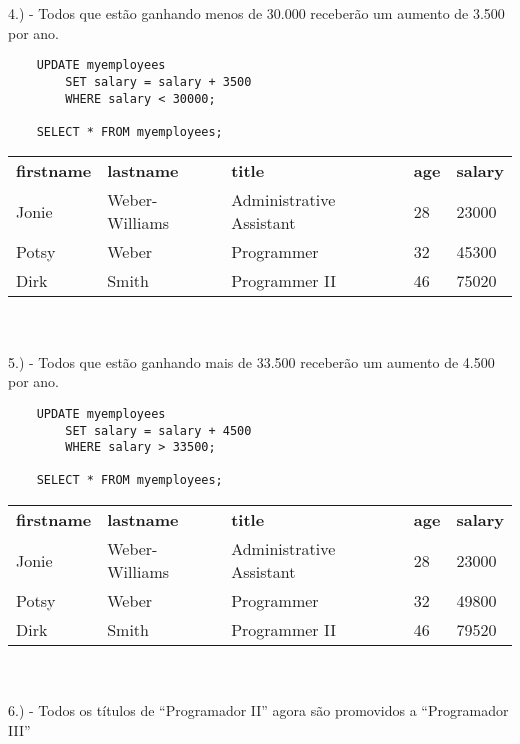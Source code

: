 4.) - Todos que estão ganhando menos de 30.000 receberão um aumento de 3.500 por ano.

\begin{lstlisting}
    UPDATE myemployees 
	    SET salary = salary + 3500 
	    WHERE salary < 30000;

    SELECT * FROM myemployees;
\end{lstlisting}

\begin{tabular}{l l l l l}
    {\textbf{firstname}} & {\textbf{lastname}} & {\textbf{title}} & {\textbf{age}} & {\textbf{salary}} \\
    {Jonie}              & {Weber-Williams}    & {Administrative Assistant}      & {28}           & {23000}           \\
    {Potsy}              & {Weber}             & {Programmer}     & {32}           & {45300}           \\
    {Dirk}               & {Smith}             & {Programmer II}  & {46}           & {75020}          
\end{tabular} \\ \\

5.) - Todos que estão ganhando mais de 33.500 receberão um aumento de 4.500 por ano.

\begin{lstlisting}
    UPDATE myemployees 
	    SET salary = salary + 4500 
	    WHERE salary > 33500;

    SELECT * FROM myemployees;
\end{lstlisting}

\begin{tabular}{l l l l l}
    {\textbf{firstname}} & {\textbf{lastname}} & {\textbf{title}} & {\textbf{age}} & {\textbf{salary}} \\
    {Jonie}              & {Weber-Williams}    & {Administrative Assistant}      & {28}           & {23000}           \\
    {Potsy}              & {Weber}             & {Programmer}     & {32}           & {49800}           \\
    {Dirk}               & {Smith}             & {Programmer II}  & {46}           & {79520}          
\end{tabular} \\ \\

6.) - Todos os títulos de “Programador II” agora são promovidos a “Programador III”

